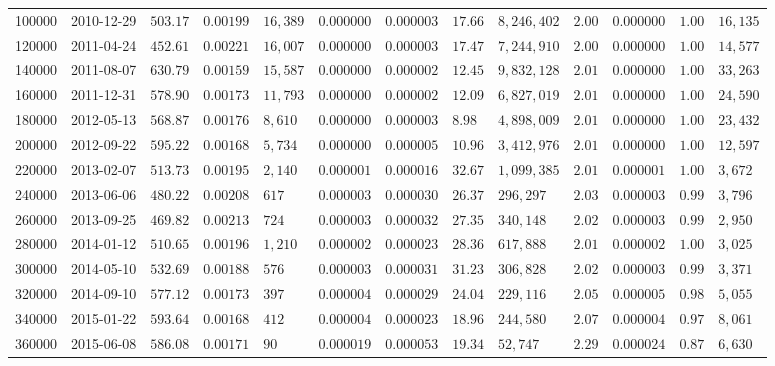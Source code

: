 \begin{tabular}{rllllllllllll}
\toprule
\midrule
100000 & 2010-12-29 & $503.17$ & $0.00199$ & $16,389$ & $0.000000$ & $0.000003$ & $17.66$ & $8,246,402$ & $2.00$ & $0.000000$ & $1.00$ & $16,135$ \\
120000 & 2011-04-24 & $452.61$ & $0.00221$ & $16,007$ & $0.000000$ & $0.000003$ & $17.47$ & $7,244,910$ & $2.00$ & $0.000000$ & $1.00$ & $14,577$ \\
140000 & 2011-08-07 & $630.79$ & $0.00159$ & $15,587$ & $0.000000$ & $0.000002$ & $12.45$ & $9,832,128$ & $2.01$ & $0.000000$ & $1.00$ & $33,263$ \\
160000 & 2011-12-31 & $578.90$ & $0.00173$ & $11,793$ & $0.000000$ & $0.000002$ & $12.09$ & $6,827,019$ & $2.01$ & $0.000000$ & $1.00$ & $24,590$ \\
180000 & 2012-05-13 & $568.87$ & $0.00176$ & $8,610$ & $0.000000$ & $0.000003$ & $8.98$ & $4,898,009$ & $2.01$ & $0.000000$ & $1.00$ & $23,432$ \\
200000 & 2012-09-22 & $595.22$ & $0.00168$ & $5,734$ & $0.000000$ & $0.000005$ & $10.96$ & $3,412,976$ & $2.01$ & $0.000000$ & $1.00$ & $12,597$ \\
220000 & 2013-02-07 & $513.73$ & $0.00195$ & $2,140$ & $0.000001$ & $0.000016$ & $32.67$ & $1,099,385$ & $2.01$ & $0.000001$ & $1.00$ & $3,672$ \\
240000 & 2013-06-06 & $480.22$ & $0.00208$ & $617$ & $0.000003$ & $0.000030$ & $26.37$ & $296,297$ & $2.03$ & $0.000003$ & $0.99$ & $3,796$ \\
260000 & 2013-09-25 & $469.82$ & $0.00213$ & $724$ & $0.000003$ & $0.000032$ & $27.35$ & $340,148$ & $2.02$ & $0.000003$ & $0.99$ & $2,950$ \\
280000 & 2014-01-12 & $510.65$ & $0.00196$ & $1,210$ & $0.000002$ & $0.000023$ & $28.36$ & $617,888$ & $2.01$ & $0.000002$ & $1.00$ & $3,025$ \\
300000 & 2014-05-10 & $532.69$ & $0.00188$ & $576$ & $0.000003$ & $0.000031$ & $31.23$ & $306,828$ & $2.02$ & $0.000003$ & $0.99$ & $3,371$ \\
320000 & 2014-09-10 & $577.12$ & $0.00173$ & $397$ & $0.000004$ & $0.000029$ & $24.04$ & $229,116$ & $2.05$ & $0.000005$ & $0.98$ & $5,055$ \\
340000 & 2015-01-22 & $593.64$ & $0.00168$ & $412$ & $0.000004$ & $0.000023$ & $18.96$ & $244,580$ & $2.07$ & $0.000004$ & $0.97$ & $8,061$ \\
360000 & 2015-06-08 & $586.08$ & $0.00171$ & $90$ & $0.000019$ & $0.000053$ & $19.34$ & $52,747$ & $2.29$ & $0.000024$ & $0.87$ & $6,630$ \\

\end{tabular}
